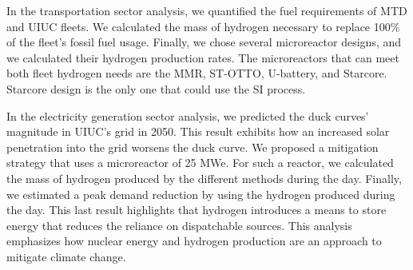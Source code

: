 \documentclass[11pt,letterpaper]{article}
\begin{document}
In the transportation sector analysis, we quantified the fuel requirements of \gls{MTD} and \gls{UIUC} fleets.
We calculated the mass of hydrogen necessary to replace 100$\%$ of the fleet's fossil fuel usage.
Finally, we chose several microreactor designs, and we calculated their hydrogen production rates.
The microreactors that can meet both fleet hydrogen needs are the MMR, ST-OTTO, U-battery, and Starcore.
Starcore design is the only one that could use the \gls{SI} process.

In the electricity generation sector analysis, we predicted the duck curves' magnitude in UIUC's grid in 2050.
This result exhibits how an increased solar penetration into the grid worsens the duck curve.
We proposed a mitigation strategy that uses a microreactor of 25 MWe.
For such a reactor, we calculated the mass of hydrogen produced by the different methods during the day.
Finally, we estimated a peak demand reduction by using the hydrogen produced during the day.
This last result highlights that hydrogen introduces a means to store energy that reduces the reliance on dispatchable sources.
This analysis emphasizes how nuclear energy and hydrogen production are an approach to mitigate climate change.

\pagebreak


\end{document}
